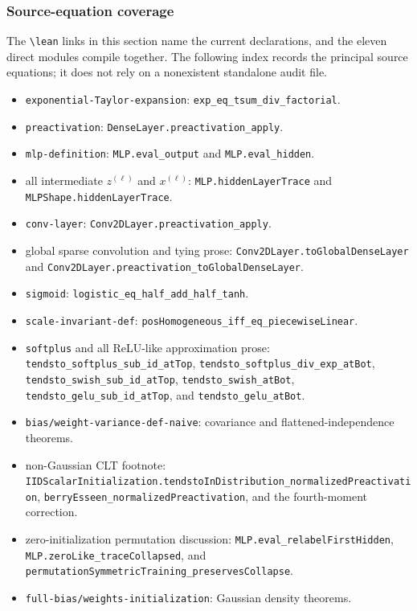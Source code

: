 \subsubsection*{Source-equation coverage}
The \texttt{\textbackslash lean} links in this section name the current declarations, and the eleven
direct modules compile together.  The following index records the principal source equations; it
does not rely on a nonexistent standalone audit file.
\begin{itemize}
  \item \texttt{exponential-Taylor-expansion}: \texttt{exp\_eq\_tsum\_div\_factorial}.
  \item \texttt{preactivation}: \texttt{DenseLayer.preactivation\_apply}.
  \item \texttt{mlp-definition}: \texttt{MLP.eval\_output} and \texttt{MLP.eval\_hidden}.
  \item all intermediate $z^{(\ell)}$ and $x^{(\ell)}$:
    \texttt{MLP.hiddenLayerTrace} and \texttt{MLPShape.hiddenLayerTrace}.
  \item \texttt{conv-layer}: \texttt{Conv2DLayer.preactivation\_apply}.
  \item global sparse convolution and tying prose:
    \texttt{Conv2DLayer.toGlobalDenseLayer} and
    \texttt{Conv2DLayer.preactivation\_toGlobalDenseLayer}.
  \item \texttt{sigmoid}: \texttt{logistic\_eq\_half\_add\_half\_tanh}.
  \item \texttt{scale-invariant-def}: \texttt{posHomogeneous\_iff\_eq\_piecewiseLinear}.
  \item \texttt{softplus} and all ReLU-like approximation prose:
    \texttt{tendsto\_softplus\_sub\_id\_atTop},
    \texttt{tendsto\_softplus\_div\_exp\_atBot},
    \texttt{tendsto\_swish\_sub\_id\_atTop}, \texttt{tendsto\_swish\_atBot},
    \texttt{tendsto\_gelu\_sub\_id\_atTop}, and \texttt{tendsto\_gelu\_atBot}.
  \item \texttt{bias/weight-variance-def-naive}: covariance and flattened-independence theorems.
  \item non-Gaussian CLT footnote:
    \texttt{IIDScalarInitialization.tendstoInDistribution\_normalizedPreactivation},
    \texttt{berryEsseen\_normalizedPreactivation}, and the fourth-moment correction.
  \item zero-initialization permutation discussion:
    \texttt{MLP.eval\_relabelFirstHidden}, \texttt{MLP.zeroLike\_traceCollapsed}, and
    \texttt{permutationSymmetricTraining\_preservesCollapse}.
  \item \texttt{full-bias/weights-initialization}: Gaussian density theorems.

\end{itemize}
